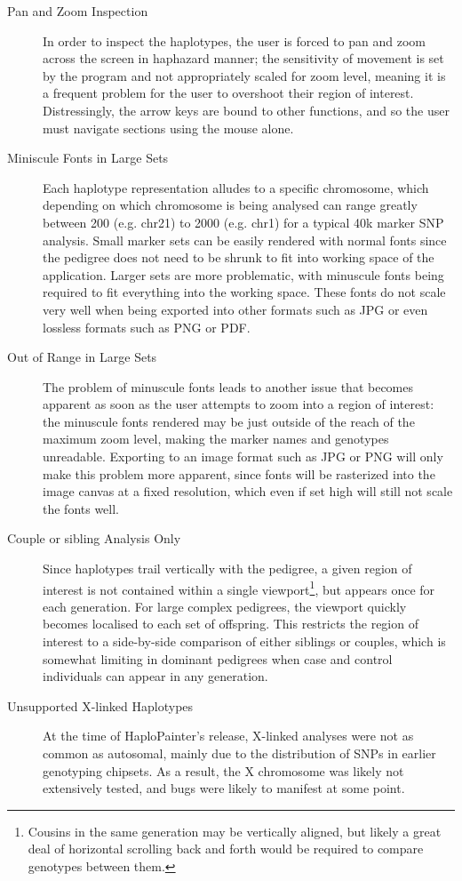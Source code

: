 \begin{description}
\item[Pan and Zoom Inspection]{In order to inspect the haplotypes, the user is forced to pan and zoom across the screen in haphazard manner; the sensitivity of movement is set by the program and not appropriately scaled for zoom level, meaning it is a frequent problem for the user to overshoot their region of interest. Distressingly, the arrow keys are bound to other functions, and so the user must navigate sections using the mouse alone.}
\item[Miniscule Fonts in Large Sets]{Each haplotype representation alludes to a specific chromosome, which depending on which chromosome is being analysed can range greatly between 200 (e.g. chr21) to 2000 (e.g. chr1) for a typical 40k marker SNP analysis. Small marker sets can be easily rendered with normal fonts since the pedigree does not need to be shrunk to fit into working space of the application. Larger sets are more problematic, with minuscule fonts being required to fit everything into the working space. These fonts do not scale very well when being exported into other formats such as JPG or even lossless formats such as PNG or PDF.}
\item[Out of Range in Large Sets]{The problem of minuscule fonts leads to another issue that becomes apparent as soon as the user attempts to zoom into a region of interest: the minuscule fonts rendered may be just outside of the reach of the maximum zoom level, making the marker names and genotypes unreadable. Exporting to an image format such as JPG or PNG will only make this problem more apparent, since fonts will be rasterized into the image canvas  at a fixed resolution, which even if set high will still not scale the fonts well.}
\item[Couple or sibling Analysis Only]{Since haplotypes trail vertically with the pedigree, a given region of interest is not contained within a single viewport\footnote{Cousins in the same generation may be vertically aligned, but likely a great deal of horizontal scrolling back and forth would be required to compare genotypes between them.}, but appears once for each generation. For large complex pedigrees, the viewport quickly becomes localised to each set of offspring. This restricts the region of interest to a side-by-side comparison of either siblings or couples, which is somewhat limiting in dominant pedigrees when case and control individuals can appear in any generation.}
\item[Unsupported X-linked Haplotypes]{At the time of HaploPainter's release, X-linked analyses were not as common as autosomal, mainly due to the distribution of SNPs in earlier genotyping chipsets. As a result, the X chromosome was likely not extensively tested, and bugs were likely to manifest at some point.}
\end{description}

